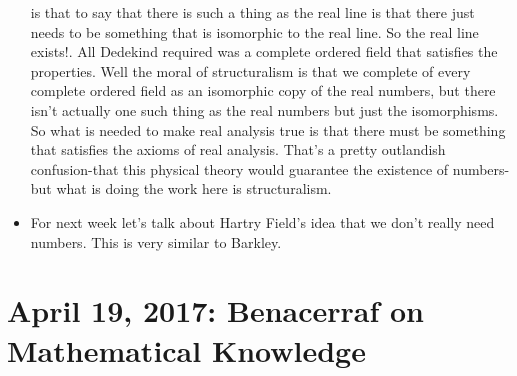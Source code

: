 \documentclass[12pt]{article}
\theoremstyle{definition}
\begin{document}
\begin{itemize}
        is that to say that there is such a thing as the real line is that
        there just needs to be something that is isomorphic to the real line.
        So the real line exists!. All Dedekind required was a complete ordered
        field that satisfies the properties. Well the moral of structuralism is
        that we complete of every complete ordered field as an isomorphic copy
        of the real numbers, but there isn't actually one such thing as the
        real numbers but just the isomorphisms. So what is needed to make real
        analysis true is that there must be something that satisfies the axioms
        of real analysis. That's a pretty outlandish confusion-that this
        physical theory would guarantee the existence of numbers-but what is
        doing the work here is structuralism.
    \item
        For next week let's talk about Hartry Field's idea that we don't really
        need numbers. This is very similar to Barkley.

\end{itemize}

\section{April 19, 2017: Benacerraf on Mathematical Knowledge}
\end{document}
